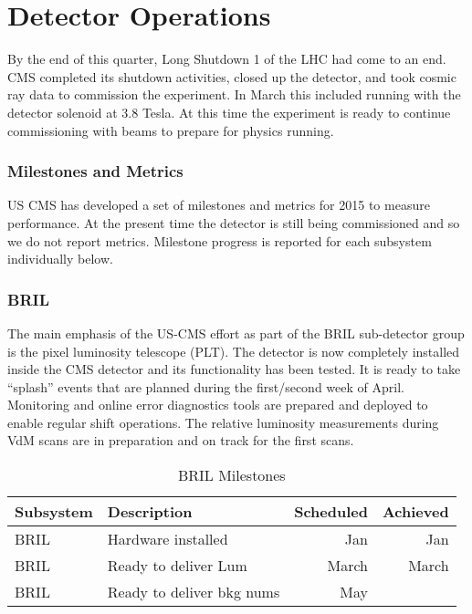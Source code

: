 
\chapter{Detector Operations}
By the end of this quarter, Long Shutdown 1 of the LHC had come to an end.  CMS completed its shutdown activities, closed up the detector, and took cosmic ray data to commission the experiment.   In March this included running with the detector solenoid at 3.8 Tesla.  At this time the experiment is ready to continue commissioning with beams to prepare for physics running.

\subsection{Milestones and Metrics}
US CMS has developed a set of milestones and metrics for 2015 to measure performance.   At the present time the detector is still being commissioned and so we do not report metrics.   Milestone progress is reported for each subsystem individually below.


\subsection{BRIL}
The main emphasis of the US-CMS effort as part of the BRIL sub-detector group is the pixel 
luminosity telescope (PLT). The detector is now completely installed inside the CMS detector 
and its functionality has been tested. It is ready to take ``splash'' events that are planned 
during the first/second week of April. Monitoring and online error diagnostics tools are prepared and deployed to enable
regular shift operations. The relative luminosity measurements during VdM scans are in preparation 
and on track for the first scans. 

\begin{table}[htp]
\caption{BRIL Milestones}
\begin{center}
\begin{tabular}{|l|l|r|r|}
\hline
Subsystem&Description&Scheduled&Achieved\\
\hline
BRIL & Hardware installed& Jan & Jan\\
\hline
BRIL& Ready to deliver Lum& March & March \\
\hline
BRIL & Ready to deliver bkg nums& May & \\
\hline
\end{tabular}
\end{center}
\label{BRILMIlestones}
\end{table}


